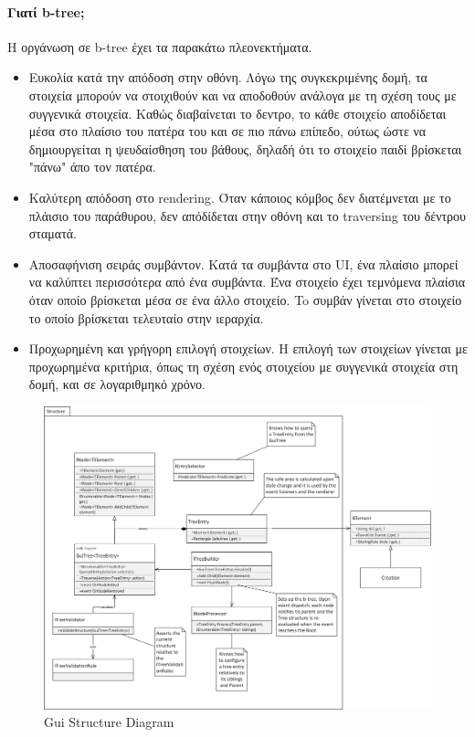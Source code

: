 \paragraph{Γιατί b-tree;}
Η οργάνωση σε b-tree έχει τα παρακάτω πλεονεκτήματα.
\begin{itemize}
	\item Ευκολία κατά την απόδοση στην οθόνη. Λόγω της συγκεκριμένης δομή, τα στοιχεία μπορούν να στοιχιθούν και να αποδοθούν ανάλογα με τη σχέση τους με συγγενικά στοιχεία. Καθώς διαβαίνεται το δεντρο, το κάθε στοιχείο αποδίδεται μέσα στο πλαίσιο του πατέρα του και σε πιο πάνω επίπεδο, ούτως ώστε να δημιουργείται η ψευδαίσθηση του βάθους, δηλαδή ότι το στοιχείο παιδί βρίσκεται "πάνω" άπο τον πατέρα.
	\item Καλύτερη απόδοση στο rendering. Όταν κάποιος κόμβος δεν διατέμνεται με το πλάισιο του παράθυρου, δεν απόδίδεται στην οθόνη και το traversing του δέντρου σταματά.
	\item Αποσαφήνιση σειράς συμβάντον. Κατά τα συμβάντα στο UI, ένα πλαίσιο μπορεί να καλύπτει περισσότερα από ένα συμβάντα. Ένα στοιχείο έχει τεμνόμενα πλαίσια όταν οποίο βρίσκεται μέσα σε ένα άλλο στοιχείο. To συμβάν γίνεται στο στοιχείο το οποίο βρίσκεται τελευταίο στην ιεραρχία.
	\item Προχωρημένη και γρήγορη επιλογή στοιχείων. Η επιλογή των στοιχείων γίνεται με προχωρημένα κριτήρια, όπως τη σχέση ενός στοιχείου με συγγενικά στοιχεία στη δομή, και σε λογαριθμηκό χρόνο.
\end{itemize}
	\begin{figure}[h!]
		\centering
		\includegraphics[width=165mm]{Images/gui_structure}
		\caption{Gui Structure Diagram}
		\label{fig:gui_structure}
	\end{figure}

